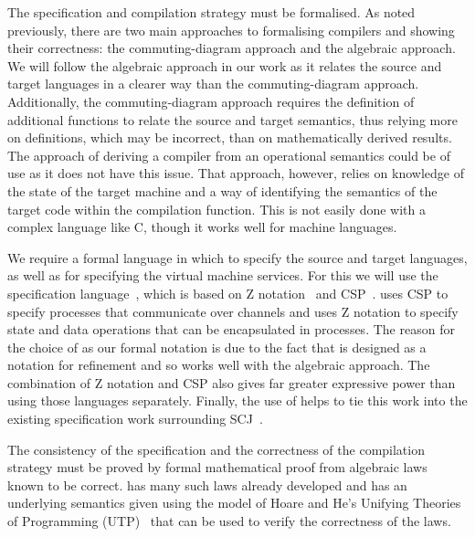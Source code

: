 \documentclass[a4paper,10pt]{report}
\begin{document}
The specification and compilation strategy must be formalised.
As noted previously, there are two main approaches to formalising
compilers and showing their correctness: the commuting-diagram
approach and the algebraic approach.
We will follow the algebraic approach in our work as it relates the
source and target languages in a clearer way than the
commuting-diagram approach.
Additionally, the commuting-diagram approach requires the definition
of additional functions to relate the source and target semantics,
thus relying more on definitions, which may be incorrect, than on
mathematically derived results.
The approach of deriving a compiler from an operational semantics
could be of use as it does not have this issue.
That approach, however, relies on knowledge of the state of the target
machine and a way of identifying the semantics of the target code
within the compilation function.
This is not easily done with a complex language like C, though it
works well for machine languages.

We require a formal language in which to specify the source and target
languages, as well as for specifying the virtual machine services.
For this we will use the \Circus{} specification
language~\cite{oliveira2009}, which is based on Z
notation~\cite{woodcock1996} and CSP~\cite{roscoe2011}.
\Circus{} uses CSP to specify processes that communicate over channels
and uses Z notation to specify state and data operations that can be
encapsulated in processes.
The reason for the choice of \Circus{} as our formal notation is due
to the fact that \Circus{} is designed as a notation for refinement
and so works well with the algebraic approach.
The combination of Z notation and CSP also gives far greater
expressive power than using those languages separately.
Finally, the use of \Circus{} helps to tie this work into the existing
specification work surrounding SCJ~\cite{cavalcanti2011,
  cavalcanti2011a, cavalcanti2013, zeyda2011}.

The consistency of the specification and the correctness of the
compilation strategy must be proved by formal mathematical proof from
algebraic laws known to be correct.
\Circus{} has many such laws already developed and has an underlying
semantics given using the model of Hoare and He's Unifying Theories of
Programming (UTP)~\cite{hoare1998} that can be used to verify the
correctness of the laws.
\end{document}
